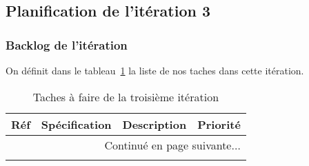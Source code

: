\subsection{Planification de l'itération 3}

\subsubsection{Backlog de l'itération}

On définit dans le tableau~\ref{tab:sprint3-backlog} la liste de nos taches
dans cette itération.

\begin{center}
    \footnotesize
    \begin{longtable}{| p{1cm} | p{5cm} | p{7cm} | p{1cm} |}
        \caption{Taches à faire de la troisième itération}
        \label{tab:sprint3-backlog} \\

 \hline
 \multicolumn{1}{|c}{\textbf{Réf}} &
 \multicolumn{1}{|c}{\textbf{Spécification}} &
 \multicolumn{1}{|c}{\textbf{Description}} &
 \multicolumn{1}{|c|}{\textbf{Priorité}} \\ \hline
 \endhead

 \hline \multicolumn{4}{|r|}{{Continué en page suivante$\dotsc$}} \\ \hline
 \endfoot

 \hline \hline
 \endlastfoot


\end{longtable}
\end{center}
